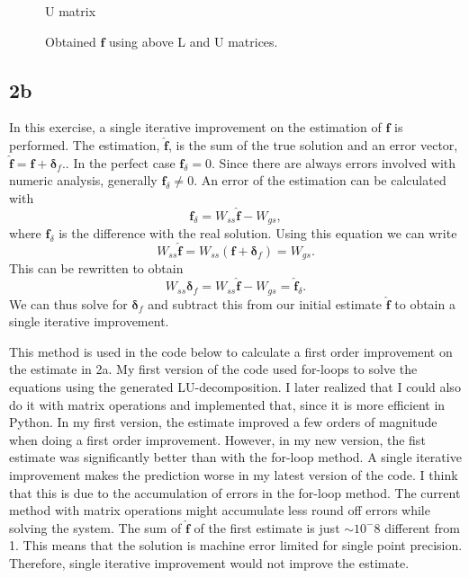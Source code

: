 \begin{figure}[H]
    \centering
    
    \caption{U matrix}
    \label{fig:2a_U}
\end{figure}

\begin{figure}[H]
    \centering
    
    \caption{Obtained $\mathbf{f}$ using above L and U matrices.}
    \label{fig:2a_f}
\end{figure}

\newpage

\subsection*{2b}
In this exercise, a single iterative improvement on the estimation of $\mathbf{f}$ is performed. The estimation, $\hat{\mathbf{f}}$, is the sum of the true solution and an error vector, $\hat{\mathbf{f}} = \mathbf{f} + \mathbf{\delta}_f.$. In the perfect case $\mathbf{f}_\delta=0$. Since there are always errors involved with numeric analysis, generally $\mathbf{f}_\delta\neq 0$. An error of the estimation can be calculated with
\begin{equation}
    \mathbf{f}_\delta = W_{ss}\mathbf{\hat{f}} - W_{gs},
\end{equation}
where $\mathbf{f}_\delta$ is the difference with the real solution. Using this equation we can write
\begin{equation}
    W_{ss}\hat{\mathbf{f}} = W_{ss}(\mathbf{f} + \mathbf{\delta}_f) = W_{gs}.
\end{equation}
This can be rewritten to obtain
\begin{equation}
    W_{ss}\mathbf{\delta}_f = W_{ss}\mathbf{\hat{f}} - W_{gs} = \hat{\mathbf{f}}_\delta.
\end{equation}
We can thus solve for $\mathbf{\delta}_f$ and subtract this from our initial estimate $\hat{\mathbf{f}}$ to obtain a single iterative improvement.

This method is used in the code below to calculate a first order improvement on the estimate in 2a. My first version of the code used for-loops to solve the equations using the generated LU-decomposition. I later realized that I could also do it with matrix operations and implemented that, since it is more efficient in Python. In my first version, the estimate improved a few orders of magnitude when doing a first order improvement. However, in my new version, the fist estimate was significantly better than with the for-loop method. A single iterative improvement makes the prediction worse in my latest version of the code. I think that this is due to the accumulation of errors in the for-loop method. The current method with matrix operations might accumulate less round off errors while solving the system. The sum of $\hat{\mathbf{f}}$ of the first estimate is just $\sim 10^-8$ different from 1. This means that the solution is machine error limited for single point precision. Therefore, single iterative improvement would not improve the estimate.

